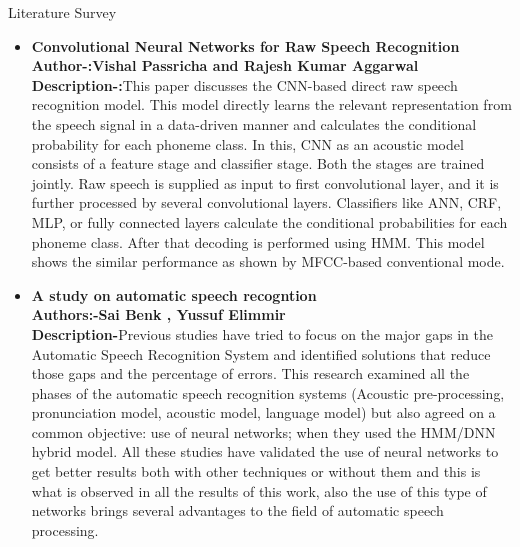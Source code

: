 \documentclass{beamer}
\begin{document}
\begin{frame}[allowframebreaks]{Literature Survey}
\begin{itemize}
		\item \textbf{Convolutional Neural Networks for Raw Speech Recognition}\\
		\textbf{Author-:Vishal Passricha and Rajesh Kumar Aggarwal}\\
		\vspace{0.5cm}
		\textbf{Description-:}This paper discusses the CNN-based direct raw speech recognition model. This model directly learns the relevant representation from the speech signal in a data-driven manner and calculates the conditional probability for each phoneme class. In this, CNN as an acoustic model consists of a feature stage and classifier stage. Both the stages are trained jointly. Raw speech is supplied as input to first convolutional layer, and it is further processed by several convolutional layers. Classifiers like ANN, CRF, MLP, or fully connected layers calculate the conditional probabilities for each phoneme class. After that decoding is performed using HMM. This model shows the similar performance as shown by MFCC-based conventional mode.
		\item \textbf{A study on automatic speech recogntion}\\
		\vspace{0.5 cm}
		\textbf{Authors:-Sai Benk , Yussuf Elimmir}\\
		\textbf{Description-}Previous studies have tried to focus on the major gaps in the Automatic Speech Recognition System and identified solutions that reduce those gaps and the percentage of errors. This research examined all the phases of the automatic speech recognition systems (Acoustic pre-processing, pronunciation model, acoustic model, language model) but also agreed on a common objective: use of neural networks;  when they used the HMM/DNN hybrid model. All these studies have validated the use of neural networks to get better results both with other techniques or without them and this is what is observed in all the results of this work, also the use of this type of networks brings several advantages to the field of automatic speech processing.
		
		\end{itemize} 
	\end{frame}
\end{document}
